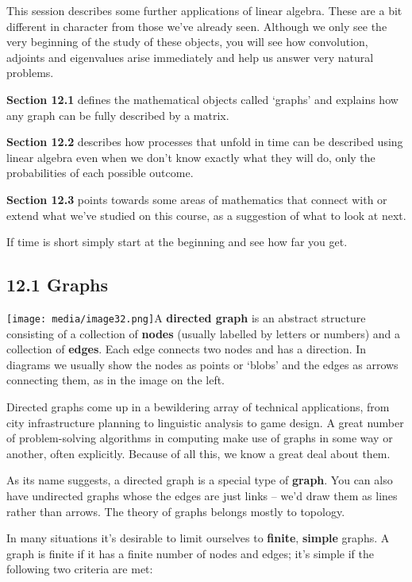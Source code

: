 \documentclass[oneside,english]{amsbook}
\numberwithin{section}{chapter}
\theoremstyle{plain}
\theoremstyle{definition}
\begin{document}
This session describes some further applications of linear algebra.
These are a bit different in character from those we've already seen.
Although we only see the very beginning of the study of these objects,
you will see how convolution, adjoints and eigenvalues arise immediately
and help us answer very natural problems.

\textbf{Section 12.1} defines the mathematical objects called `graphs'
and explains how any graph can be fully described by a matrix.

\textbf{Section 12.2} describes how processes that unfold in time can be
described using linear algebra even when we don't know exactly what they
will do, only the probabilities of each possible outcome.

\textbf{Section 12.3} points towards some areas of mathematics that
connect with or extend what we've studied on this course, as a
suggestion of what to look at next.

If time is short simply start at the beginning and see how far you get.

\subsection{12.1 Graphs}\label{graphs}

\texttt{[image: media/image32.png]}A
\textbf{directed graph} is an abstract structure consisting of a
collection of \textbf{nodes} (usually labelled by letters or numbers)
and a collection of \textbf{edges}. Each edge connects two nodes and has
a direction. In diagrams we usually show the nodes as points or
`blobs' and the edges as arrows connecting them, as in the image on
the left.

Directed graphs come up in a bewildering array of technical
applications, from city infrastructure planning to linguistic analysis
to game design. A great number of problem-solving algorithms in
computing make use of graphs in some way or another, often explicitly.
Because of all this, we know a great deal about them.

As its name suggests, a directed graph is a special type of
\textbf{graph}. You can also have undirected graphs whose the edges are
just links -- we'd draw them as lines rather than arrows. The theory of
graphs belongs mostly to topology.

In many situations it's desirable to limit ourselves to \textbf{finite},
\textbf{simple} graphs. A graph is finite if it has a finite number of
nodes and edges; it's simple if the following two criteria are met:
\end{document}

